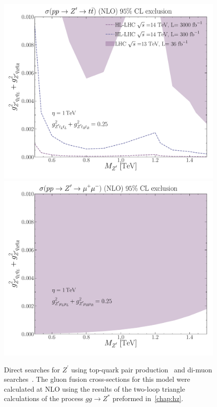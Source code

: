 \begin{figure}[htpb!]
	\includegraphics[scale=0.235]{figures/bounds_xs.pdf}
	\includegraphics[scale=0.235]{figures/zmumu.pdf}
	\caption{Direct searches for $Z^\prime$ using top-quark pair production~\cite{ATLAS:2019npw} and di-muon searches~\cite{ATLAS:2019npw}. The gluon fusion cross-sections for this model were calculated at NLO using the results of the two-loop triangle calculations of the process $ gg \to Z^*$ preformed in~\autoref{chap:hz}.}
	\label{fig:Zp_constraints1}
\end{figure}
